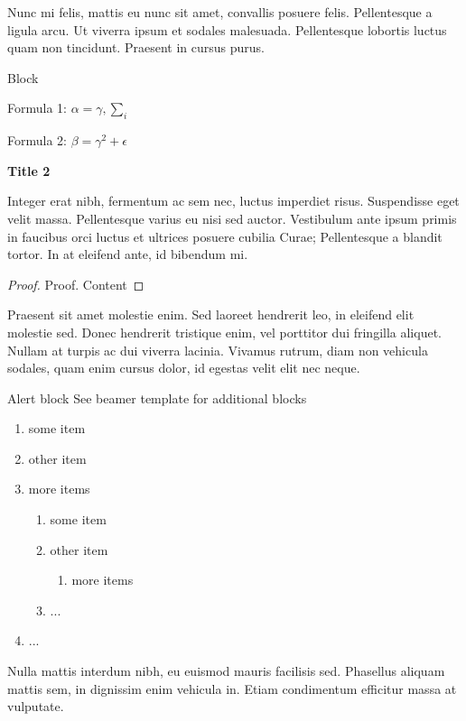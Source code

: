 \documentclass{beamer}
\begin{document}
\begin{frame}[t]
\begin{columns}[t]
\begin{column}{.49\textwidth}
\begin{figure}
	\end{figure}
		\justifying
		Nunc mi felis, mattis eu nunc sit amet, convallis posuere felis. Pellentesque a ligula arcu. Ut viverra ipsum et sodales malesuada. Pellentesque lobortis luctus quam non tincidunt. Praesent in cursus purus. 
		
			\begin{block}{Block}
			\begin{center}
			Formula 1: \hspace{2em}	$\alpha=\gamma, \sum_{i}$
			
			Formula 2:	\hspace{2em} $\beta=\gamma^2+\epsilon$
			\end{center}
			\end{block}
	
		\vspace{0.5em}
		{\bfseries Title 2}
		
		Integer erat nibh, fermentum ac sem nec, luctus imperdiet risus. Suspendisse eget velit massa. Pellentesque varius eu nisi sed auctor. Vestibulum ante ipsum primis in faucibus orci luctus et ultrices posuere cubilia Curae; Pellentesque a blandit tortor. In at eleifend ante, id bibendum mi. 
		
		\begin{proof}{Proof.}
		Content
		\end{proof}
		
		Praesent sit amet molestie enim. Sed laoreet hendrerit leo, in eleifend elit molestie sed. Donec hendrerit tristique enim, vel porttitor dui fringilla aliquet. Nullam at turpis ac dui viverra lacinia. Vivamus rutrum, diam non vehicula sodales, quam enim cursus dolor, id egestas velit elit nec neque. 
		
		\begin{alertblock}{Alert block}
		See beamer template for additional blocks
		\end{alertblock}
		
		\begin{enumerate}
		\item some item
		\item other item
		\item more items 
			\begin{enumerate}
			\item some item
			\item other item
				\begin{enumerate}
				\item more items 
				\end{enumerate}
			\item ...
			\end{enumerate}
		\item ...
		\end{enumerate}
	
		 Nulla mattis interdum nibh, eu euismod mauris facilisis sed. Phasellus aliquam mattis sem, in dignissim enim vehicula in. Etiam condimentum efficitur massa at vulputate.
	\end{column}
\end{columns}

\end{frame}
\end{document}
